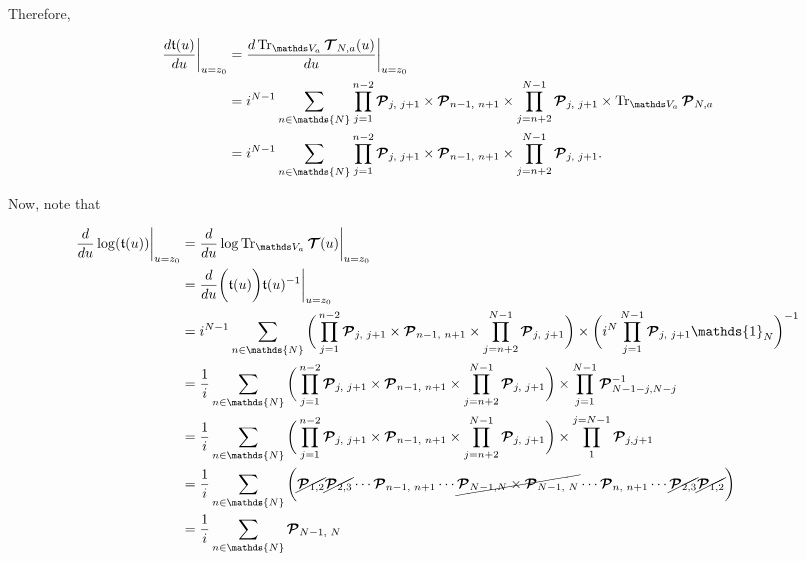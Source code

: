 \documentclass{homework}
\begin{document}
Therefore,

\begin{equation}
    \begin{split}
        \frac{d \mathfrak{t}(u)}{du}\bigg|_{u = z_0} &= \frac{d \Tr_{\vds_{a}} \bmt_{N,a}(u)}{du}\bigg|_{u = z_0} \\
        &= i^{N-1} \sum_{n \in \mathds{N}} \prod_{j=1}^{n-2} \bm{\mathcal{P}}_{j, \blanky j+1} 
        \times \bm{\mathcal{P}}_{n-1, \blanky n+1} \times \prod_{j=n+2}^{N-1}  \bm{\mathcal{P}}_{j, \blanky j+1} \times \Tr_{\vds_{a}} \bm{\mathcal{P}}_{N, a} \\
        &= i^{N-1} \sum_{n \in \mathds{N}} \prod_{j=1}^{n-2} \bm{\mathcal{P}}_{j, \blanky j+1} 
        \times \bm{\mathcal{P}}_{n-1, \blanky n+1} \times \prod_{j=n+2}^{N-1}  \bm{\mathcal{P}}_{j, \blanky j+1}.
    \end{split}
\end{equation}

Now, note that 

\begin{equation}
    \begin{split}
        \frac{d}{du} \log(\mathfrak{t}(u))\bigg|_{u = z_0} &= \frac{d}{du} \log \Tr_{\vds_{a}} \bm{\mathcal{T}}(u) \bigg|_{u=z_0} \\
        &= \frac{d}{du}\bigg(\mathfrak{t}(u)\bigg) \mathfrak{t}(u)^{-1}\bigg|_{u = z_0} \\
        &= i^{N-1} \sum_{n \in \mathds{N}} \bigg( \prod_{j=1}^{n-2} \bm{\mathcal{P}}_{j, \blanky j+1} 
        \times \bm{\mathcal{P}}_{n-1, \blanky n+1} \times \prod_{j=n+2}^{N-1}  \bm{\mathcal{P}}_{j, \blanky j+1} \bigg) \times \bigg(i^N \prod_{j=1}^{N-1} \bm{\mathcal{P}}_{j, \blanky j+1} \mathds{1}_N\bigg)^{-1} \\
        &= \frac{1}{i} \sum_{n \in \mathds{N}} \bigg(\prod_{j=1}^{n-2} \bm{\mathcal{P}}_{j, \blanky j+1} 
        \times \bm{\mathcal{P}}_{n-1, \blanky n+1} \times \prod_{j=n+2}^{N-1}  \bm{\mathcal{P}}_{j, \blanky j+1} \bigg) \times \prod_{j=1}^{N-1} \bm{\mathcal{P}}_{N-1-j, N-j}^{-1} \\
        &= \frac{1}{i} \sum_{n \in \mathds{N}} \bigg(\prod_{j=1}^{n-2} \bm{\mathcal{P}}_{j, \blanky j+1} 
        \times \bm{\mathcal{P}}_{n-1, \blanky n+1} \times \prod_{j=n+2}^{N-1}  \bm{\mathcal{P}}_{j, \blanky j+1} \bigg) \times \prod_{1}^{j = N-1} \bm{\mathcal{P}}_{j, j+1}  \\
        &= \frac{1}{i} \sum_{n \in \mathds{N}} \bigg(\cancel{\bm{\mathcal{P}}_{1,2}} \cancel{\bm{\mathcal{P}}_{2,3}} \cdots \bm{\mathcal{P}}_{n-1, \blanky n+1} \cdots \cancel{\bm{\mathcal{P}}_{N-1,N} \times \bm{\mathcal{P}}_{N-1, \blanky N}} \cdots \bm{\mathcal{P}}_{n,\blanky n+1} \cdots \cancel{\bm{\mathcal{P}}_{2,3}} \cancel{\bm{\mathcal{P}}_{1,2}}\bigg) \\
        &= \frac{1}{i}  \sum_{n \in \mathds{N}} \bm{\mathcal{P}}_{N-1, \blanky N}
    \end{split}
\end{equation}
\end{document}
